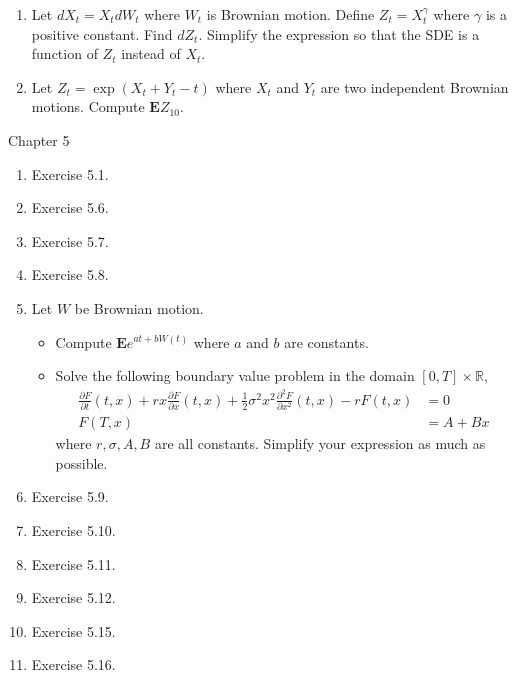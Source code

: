 \documentclass[12pt]{article}
\newcommand{\g}{\gamma}
\newcommand{\s}{\sigma}
\newcommand{\R}{\mathbb{R}}
\newcommand{\Ex}{\mathbf{E}}
\begin{document}
\begin{enumerate}
\begin{comment}
		& = 2 dt + 2(X_t + Y_t) dX_t + 2(X_t + Y_t) dY_t
\end{align*}
Thus, $D_{10} - D_0 = D_{10} = \int_0^{10} 2 dt + \int_0^{10} 2(X_t + Y_t) dX_t + \int_0^{10} 2(X_t + Y_t) dY_t$. Taking expectations yields $\Ex D_{10} = \int_0^{10} 2 dt = 20$.
\end{comment}
  \item Let $dX_t = X_t dW_t$ where $W_t$ is Brownian motion. Define $Z_t = X_t^{\g}$ where $\g$ is a positive constant. Find $dZ_t$. Simplify the expression so that the SDE is a function of $Z_t$ instead of $X_t$.
  \item Let $Z_t = \exp(X_t + Y_t - t)$ where $X_t$ and $Y_t$ are two independent Brownian motions. Compute $\Ex Z_{10}$.

\end{enumerate}



Chapter 5
\begin{enumerate}
  \item Exercise 5.1.
  \item Exercise 5.6.
  \item Exercise 5.7.
  \item Exercise 5.8.
  \item Let $W$ be Brownian motion.
  \begin{itemize}
    \item Compute $\Ex e^{a t + b W(t)}$ where $a$ and $b$ are constants.
    \item Solve the following boundary value problem in the domain $[0, T] \times \R$,
\begin{align*}
\frac{\partial F}{\partial t}(t, x) + r x \frac{\partial F}{\partial x}(t, x) + \frac{1}{2}\s^2 x^2 \frac{\partial^2 F}{\partial x^2}(t, x) - r F(t, x)	& = 0\\
F(T, x)		& = A + Bx
\end{align*}
where $r, \s, A, B$ are all constants. Simplify your expression as much as possible.
  \end{itemize}
  \item Exercise 5.9.
  \item Exercise 5.10.
  \item Exercise 5.11.
  \item Exercise 5.12.
  \item Exercise 5.15.
  \item Exercise 5.16.
\end{enumerate}
\end{document}
